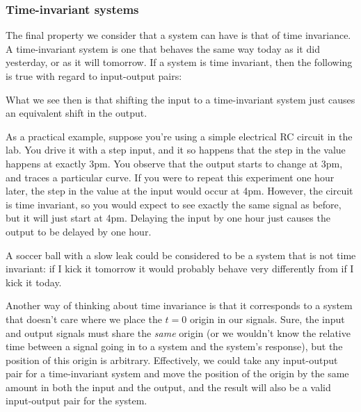 \documentclass[10pt]{beamer}
\begin{document}
\subsubsection{Time-invariant systems}

The final property we consider that a system can have is that of time invariance.  A time-invariant system is one that behaves the same way today as it did yesterday, or as it will tomorrow.  If a system is time invariant, then the following is true with regard to input-output pairs:
\begin{center}
\end{center}
What we see then is that shifting the input to a time-invariant system just causes an equivalent shift in the output.  

As a practical example, suppose you're using a simple electrical RC circuit in the lab.  You drive it with a step input, and it so happens that the step in the value happens at exactly 3pm.  You observe that the output starts to change at 3pm, and traces a particular curve.    If you were to repeat this experiment one hour later, the step in the value at the input would occur at 4pm.  However, the circuit is time invariant, so you would expect to see exactly the same signal as before, but it will just start at 4pm.  Delaying the input by one hour just causes the output to be delayed by one hour.

A soccer ball with a slow leak could be considered to be a system that is not time invariant:  if I kick it tomorrow it would probably behave very differently from if I kick it today.  

Another way of thinking about time invariance is that it corresponds to a system that doesn't care where we place the $t=0$ origin in our signals.  Sure, the input and output signals must share the {\em same} origin (or we wouldn't know the relative time between a signal going in to a system and the system's response), but the position of this origin is arbitrary.  Effectively, we could take any input-output pair for a time-invariant system and move the position of the origin by the same amount in both the input and the output, and the result will also be a valid input-output pair for the system.
\end{document}
